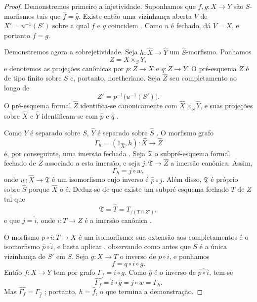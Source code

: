 \begin{proof}
Demonstremos primeiro a injetividade. Suponhamos que $f,g:X\to Y$ são
$S$-morfismos tais que $\widehat{f}=\widehat{g}$. Existe então
uma vizinhança aberta $V$ de $X'=u^{-1}(S')$ sobre a qual $f$ e $g$
coincidem . Como $u$ é fechado,
 dá $V=X$, e portanto $f=g$.

Demonstremos agora a sobrejetividade. Seja
$h:\widehat{X}\to\widehat{Y}$ um
$\widehat{S}$-morfismo. Ponhamos
\[
  Z=X\times_S Y,
\]
e denotemos as projeções canônicas por $p:Z\to X$ e
$q:Z\to Y$. O pré-esquema $Z$ é de tipo finito sobre $S$
 e, portanto, noetheriano. Seja
$\widehat{Z}$ seu completamento ao longo de
\[
  Z'=p^{-1}\bigl(u^{-1}(S')\bigr).
\]
O pré-esquema formal $\widehat{Z}$ identifica-se canonicamente com
$\widehat{X}\times_{\widehat{S}}\widehat{Y}$, e suas projeções
sobre $\widehat{X}$ e $\widehat{Y}$ identificam-se com
$\widehat{p}$ e $\widehat{q}$ .

Como $Y$ é separado sobre $S$, $\widehat{Y}$ é separado sobre
$\widehat{S}$ . O morfismo grafo
\[
  \Gamma_h=(1_{\widehat{X}},h):
  \widehat{X}\longrightarrow\widehat{Z}
\]
é, por conseguinte, uma imersão fechada . Seja
$\mathfrak{T}$ o subpré-esquema formal fechado de
$\widehat{Z}$ associado a esta imersão, e seja
$j:\mathfrak{T}\to\widehat{Z}$ a imersão canônica. Assim,
\[
  \Gamma_h=j\circ w,
\]
onde $w:\widehat{X}\to\mathfrak{T}$ é um isomorfismo
 cujo inverso é
$\widehat{p}\circ j$. Além disso, $\mathfrak{T}$ é próprio sobre
$\widehat{S}$ porque $\widehat{X}$ o é. Deduz-se de
 que existe um subpré-esquema fechado $T$ de $Z$
tal que
\[
  \mathfrak{T}
  =\widehat{T}
  =T_{/(T\cap Z')},
\]
e que $j=\widehat{i}$, onde $i:T\to Z$ é a imersão
canônica .

O morfismo $p\circ i:T\to X$ é um isomorfismo: sua extensão aos
completamentos é o isomorfismo
$\widehat{p}\circ\widehat{i}$, e basta aplicar
, observando como antes que $S$ é a única
vizinhança de $S'$ em $S$.
Seja $g:X\to T$ o inverso de $p\circ i$, e ponhamos
\[
  f=q\circ i\circ g.
\]
Então $f:X\to Y$ tem por grafo $\Gamma_f=i\circ g$. Como
$\widehat{g}$ é o inverso de
$\widehat{p\circ i}$, tem-se
\[
  \widehat{\Gamma_f}
  =\widehat{i}\circ\widehat{g}
  =j\circ w
  =\Gamma_h.
\]
Mas $\widehat{\Gamma_f}=\Gamma_{\widehat{f}}$
; portanto, $h=\widehat{f}$, o que termina a
demonstração.
\end{proof}

